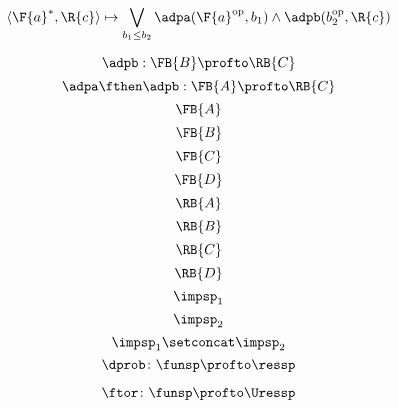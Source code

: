 {\begin{forslides}
\begin{equation}\label{eq:adp12pfexpr}
\langle\F{a}^*, \R{c}\rangle \mapsto \bigvee_{b_1\leq b_2} \adpa(\F{a}^{\text{op}}, b_1) \wedge \adpb(b_2^{\text{op}}, \R{c})
\end{equation}

\begin{equation}\label{eq:adp2}
\adpb: \FB{B} \profto  \RB{C}
\end{equation}
\begin{equation}\label{eq:adp1adp2}
\adpa\fthen\adpb: \FB{A} \profto  \RB{C}
\end{equation}
\begin{equation}\label{eq:FA}
\FB{A}
\end{equation}
\begin{equation}\label{eq:FB}
\FB{B}
\end{equation}
\begin{equation}\label{eq:FC}
\FB{C}
\end{equation}
\begin{equation}\label{eq:FD}
\FB{D}
\end{equation}
\begin{equation}\label{eq:RA}
\RB{A}
\end{equation}
\begin{equation}\label{eq:RB}
\RB{B}
\end{equation}
\begin{equation}\label{eq:RC}
\RB{C}
\end{equation}
\begin{equation}\label{eq:RD}
\RB{D}
\end{equation}
  \begin{equation}
  \label{eq:impsp1}
  \impsp_1
\end{equation}
\begin{equation}
  \label{eq:impsp2}
  \impsp_2
\end{equation}
\begin{equation}\label{eq:impsp12}
\impsp_{1} \setconcat \impsp_{2}
\end{equation}
\begin{equation}\label{eq:dproba}
  \dprob \colon \funsp \profto \ressp
\end{equation}

\begin{equation}\label{eq:dprob2}
  \ftor \colon \funsp \profto \Uressp
\end{equation}
\end{forslides}
}

